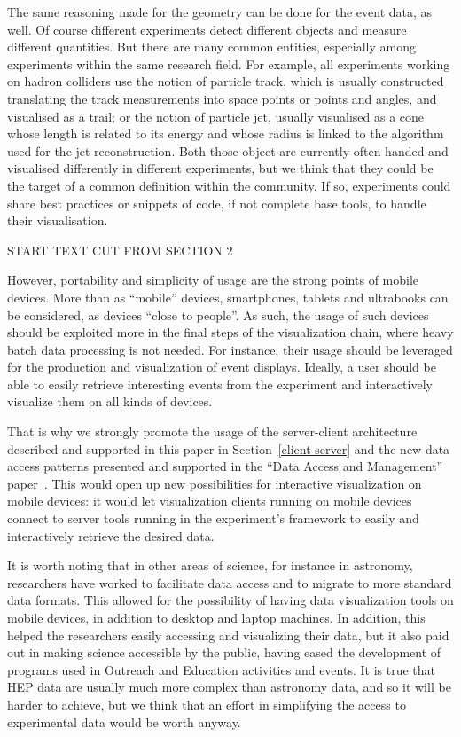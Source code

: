 \documentclass[12pt,a4paper]{article}
\begin{document}
The same reasoning made for the geometry can be done for the event data, as well. Of course different experiments detect
different objects and measure different quantities. But there are many common entities, especially among experiments
within the same research field. For example, all experiments working on hadron colliders use the notion of particle track,
which is usually constructed translating the track measurements into space points or points and angles, and visualised as
a trail; or the notion of particle jet, usually visualised as a cone whose length is related to its energy and whose radius
is linked to the algorithm used for the jet reconstruction. Both those object are currently often handed and visualised
differently in different experiments, but we think that they could be the target of a common definition within the community.
If so, experiments could share best practices or snippets of code, if not complete base tools, to handle their visualisation.

START TEXT CUT FROM SECTION 2

However, portability and simplicity of usage are the strong points of mobile devices. More than as ``mobile'' devices, smartphones,
tablets and ultrabooks can be considered, as devices ``close to people''. As such, the usage of such devices
should be exploited more in the final steps of the visualization chain, where heavy batch data processing is not needed. For instance,
their usage should be leveraged for the production and visualization of event displays.
Ideally, a user should be able to easily retrieve interesting events from the experiment and interactively visualize them on all
kinds of devices.

That is why we strongly promote the usage of the server-client architecture described and supported in this paper in Section~\ref{client-server}
and the new data access patterns presented and supported in the ``Data Access and Management'' paper~\cite{HSF-CWP-2017-04}. This would open
up new possibilities for interactive visualization on mobile devices: it would let visualization clients running on mobile devices
connect to server tools running in the experiment's framework to easily and interactively retrieve the desired data.

It is worth noting that in other areas of science, for instance in astronomy, researchers have worked to facilitate data
access and to migrate to more standard data formats. This allowed for the possibility of having data visualization tools
on mobile devices, in addition to desktop and laptop machines. In addition, this helped the researchers easily accessing and visualizing
their data, but it also paid out in making science accessible by the public, having eased the development of programs used in
Outreach and Education activities and events. It is true that HEP data are usually much more complex than astronomy data, and so it
will be harder to achieve, but we think that an effort in simplifying the access to experimental data would be worth anyway.
\end{document}
